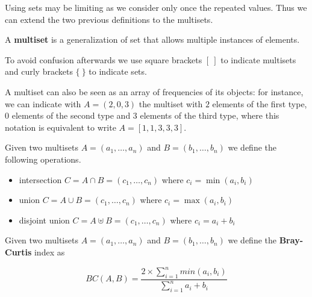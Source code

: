 Using sets may be limiting as we consider only once the repeated values. Thus we can extend the two previous definitions to the multisets.\medskip

\begin{definizione}
	A \textbf{multiset} is a generalization of set that allows multiple instances of elements.
\end{definizione}

To avoid confusion afterwards we use square brackets $[\ ]$ to indicate multisets and curly brackets $\{\ \}$ to indicate sets.\medskip

A multiset can also be seen as an array of frequencies of its objects: for instance, we can indicate with $A = (2, 0, 3)$ the multiset with $2$ elements of the first type, $0$ elements of the second type and $3$ elements of the third type, where this notation is equivalent to write $A = [1, 1, 3, 3, 3]$.\medskip

Given two multisets $A = (a_{1}, \ldots, a_{n}) $ and $B = (b_{1}, \ldots, b_{n})$ we define the following operations.

\begin{itemize}
	\item intersection $C = A \cap B  = (c_{1}, \ldots, c_{n})$ where $c_{i} = \min(a_{i}, b_{i})$
	\item union $C = A \cup B  = (c_{1}, \ldots, c_{n})$ where $c_{i} = \max(a_{i}, b_{i})$
	\item disjoint union $C = A \uplus B  = (c_{1}, \ldots, c_{n})$ where $c_{i} = a_{i} + b_{i}$
\end{itemize}

%     


\begin{definizione}\label{def:wbray}
	Given two multisets $A = (a_{1}, \ldots, a_{n}) $ and $B = (b_{1}, \ldots, b_{n})$ we define the \textbf{Bray-Curtis} index as
	
	\begin{equation}
	BC(A,B) = \frac{ 2 \times \sum\limits_{i=1}^n { min(a_{i}, b_{i}) } }{\sum\limits_{i=1}^n {a_{i} + b_{i}}}
	\end{equation}
	
\end{definizione}

